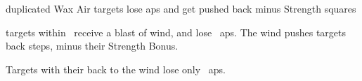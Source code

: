 
  {duplicated}%
  {Wax}%
  {Air}%
  {}%
  {targets lose  \glspl{ap} and get pushed back  minus Strength squares}%
  {
     targets within \spellRange\ receive a blast of wind, and lose ~\glspl{ap}.
    The wind pushes targets back  steps, minus their Strength Bonus.

  Targets with their back to the wind lose only
  \setcounter{track}{\value{spellCost}}%
  ~\glspl{ap}.
  }
